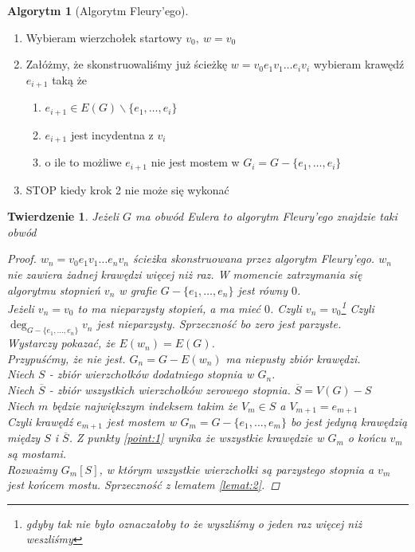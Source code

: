 \documentclass[12pt,a4paper]{article}
\newtheorem{tw}{Twierdzenie}
\theoremstyle{definition}
\newtheorem{algo}{Algorytm}
\begin{document}
\begin{algo}[Algorytm Fleury'ego]
\begin{enumerate}
\item Wybieram wierzchołek startowy $v_0, ~ w = v_0$
\item Załóżmy, że skonstruowaliśmy już ścieżkę $w=v_0e_1v_1 \dots e_iv_i$ wybieram krawędź $e_{i+1}$ taką że
	\begin{enumerate}
		\item $e_{i+1} \in E(G) \smallsetminus \{e_1, \dots, e_i\}$
		\item $e_{i+1}$ jest incydentna z $v_i$
		\item o ile to możliwe $e_{i+1}$ nie jest mostem w $G_i = G - \{e_1, \dots, e_i\}$\label{point:1}
	\end{enumerate}
\item STOP kiedy krok 2 nie może się wykonać
\end{enumerate}
\end{algo}

\begin{tw}
Jeżeli $G$ ma obwód Eulera to algorytm Fleury'ego znajdzie taki obwód
\begin{proof}
$w_n = v_0e_1v_1 \dots e_nv_n$ ścieżka skonstruowana przez algorytm Fleury'ego. $w_n$ nie zawiera żadnej krawędzi więcej niż raz. W momencie zatrzymania się algorytmu stopnień $v_n$ w grafie $G-\{e_1, \dots, e_n\}$ jest równy $0$.\\
Jeżeli $v_n = v_0$ to ma nieparzysty stopień, a ma mieć $0$. Czyli $v_n = v_0$\footnote{gdyby tak nie było oznaczałoby to  że wyszliśmy o jeden raz więcej niż weszliśmy} Czyli $\deg_{G-\{e_1, \dots, e_n\}}v_n$ jest nieparzysty. Sprzeczność bo zero jest parzyste.\\
Wystarczy pokazać, że $E(w_n)=E(G)$.\\
Przypuśćmy, że nie jest. $G_n = G-E(w_n)$ ma niepusty zbiór krawędzi.
\\ Niech $S$ - zbiór wierzchołków dodatniego stopnia w $G_n$.
\\ Niech $\overline{S}$ - zbiór wszystkich wierzchołków zerowego stopnia. $\overline{S}=V(G)-S$
\\ Niech $m$ będzie największym indeksem takim że $V_m \in S$ a $V_{m+1} = e_{m+1}$
\\ Czyli krawędź $e_{m+1}$ jest mostem w $G_m = G - \{e_1, \dots, e_m\}$ bo jest jedyną krawędzią między $S$ i $\overline{S}$. Z punkty \ref{point:1} wynika że wszystkie krawędzie w $G_m$ o końcu $v_m$ są mostami.
\\ Rozważmy $G_m[S]$, w którym wszystkie wierzchołki są parzystego stopnia a $v_m$ jest końcem mostu. Sprzeczność z lematem \ref{lemat:2}.
\end{proof}
\end{tw}
\end{document}
